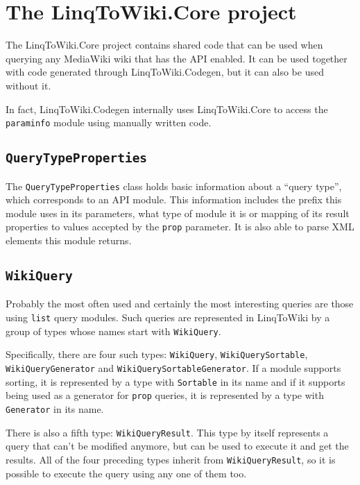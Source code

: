 \section{The LinqToWiki.Core project}

The LinqToWiki.Core project contains shared code that can be used when querying any MediaWiki wiki
that has the \ac{API} enabled.
It can be used together with code generated through LinqToWiki\allowbreak{}.Codegen,
but it can also be used without it.

In fact, LinqToWiki.\allowbreak{}Codegen internally uses LinqToWiki.Core to access the \texttt{paraminfo} module
using manually written code.

\subsection{\texorpdfstring{\lstinline{QueryTypeProperties}}{QueryTypeProperties}}

The \lstinline{QueryTypeProperties} class holds basic information about a “query type”,
which corresponds to an \ac{API} module.
This information includes the prefix this module uses in its parameters,
what type of module it is or mapping of its result properties to values accepted by the \texttt{prop} parameter.
It is also able to parse \ac{XML} elements this module returns.

\subsection{\texorpdfstring{\lstinline{WikiQuery}}{WikiQuery}}

Probably the most often used and certainly the most interesting queries are those using \texttt{list} query modules.
Such queries are represented in LinqToWiki by a group of types whose names start with \lstinline{WikiQuery}.

Specifically, there are four such types:
\lstinline{WikiQuery}, \lstinline{WikiQuerySortable}, \lstinline{Wiki}\lstBreak\lstinline{Query}\lstBreak\lstinline{Generator} and \lstinline{WikiQuerySortableGenerator}.
If a module supports sorting, it is represented by a type with \lstinline{Sortable} in its name
and if it supports being used as a generator for \texttt{prop} queries, it is represented by a type with \lstinline{Generator} in its name.

There is also a fifth type: \lstinline{WikiQueryResult}.
This type by itself represents a query that can't be modified anymore,
but can be used to execute it and get the results.
All of the four preceding types inherit from \lstinline{WikiQueryResult},
so it is possible  to execute the query using any one of them too.

